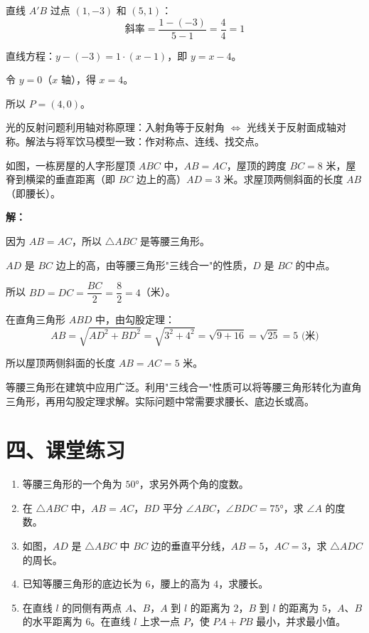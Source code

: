 \documentclass[12pt, a4paper]{ctexart}
\begin{document}
直线 $A'B$ 过点 $(1, -3)$ 和 $(5, 1)$：
$$\text{斜率} = \frac{1-(-3)}{5-1} = \frac{4}{4} = 1$$

直线方程：$y - (-3) = 1 \cdot (x - 1)$，即 $y = x - 4$。

令 $y = 0$（$x$ 轴），得 $x = 4$。

所以 $P = (4, 0)$。

\begin{tipbox}[方法总结]
光的反射问题利用轴对称原理：入射角等于反射角 $\Leftrightarrow$ 光线关于反射面成轴对称。解法与将军饮马模型一致：作对称点、连线、找交点。
\end{tipbox}

\begin{appbox}
如图，一栋房屋的人字形屋顶 $ABC$ 中，$AB = AC$，屋顶的跨度 $BC = 8$ 米，屋脊到横梁的垂直距离（即 $BC$ 边上的高）$AD = 3$ 米。求屋顶两侧斜面的长度 $AB$（即腰长）。
\end{appbox}

\textbf{解：}

因为 $AB = AC$，所以 $\triangle ABC$ 是等腰三角形。

$AD$ 是 $BC$ 边上的高，由等腰三角形"三线合一"的性质，$D$ 是 $BC$ 的中点。

所以 $BD = DC = \dfrac{BC}{2} = \dfrac{8}{2} = 4$（米）。

在直角三角形 $ABD$ 中，由勾股定理：
$$AB = \sqrt{AD^2 + BD^2} = \sqrt{3^2 + 4^2} = \sqrt{9 + 16} = \sqrt{25} = 5 \text{ (米)}$$

所以屋顶两侧斜面的长度 $AB = AC = 5$ 米。

\begin{tipbox}[方法总结]
等腰三角形在建筑中应用广泛。利用"三线合一"性质可以将等腰三角形转化为直角三角形，再用勾股定理求解。实际问题中常需要求腰长、底边长或高。
\end{tipbox}

\section*{\textcolor{tipgreen}{四、课堂练习}}

\begin{enumerate}
  \item 等腰三角形的一个角为 $50°$，求另外两个角的度数。

  \item 在 $\triangle ABC$ 中，$AB = AC$，$BD$ 平分 $\angle ABC$，$\angle BDC = 75°$，求 $\angle A$ 的度数。

  \item 如图，$AD$ 是 $\triangle ABC$ 中 $BC$ 边的垂直平分线，$AB = 5$，$AC = 3$，求 $\triangle ADC$ 的周长。

  \item 已知等腰三角形的底边长为 $6$，腰上的高为 $4$，求腰长。

  \item 在直线 $l$ 的同侧有两点 $A$、$B$，$A$ 到 $l$ 的距离为 $2$，$B$ 到 $l$ 的距离为 $5$，$A$、$B$ 的水平距离为 $6$。在直线 $l$ 上求一点 $P$，使 $PA + PB$ 最小，并求最小值。
\end{enumerate}
\end{document}
